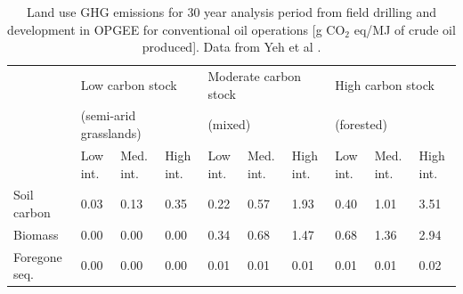 \documentclass[11pt]{report}
\begin{document}
\begin{table}
\begin{scriptsize}
\caption{Land use GHG emissions for 30 year analysis period from field drilling and development in OPGEE for conventional oil operations [g CO$_2$ eq/MJ of crude oil produced]. Data from Yeh et al \cite{Yeh2010}.}
\label{tab:default_land_use_emissions}
\begin{tabular}{p{}p{}p{}p{}p{}p{}p{}p{}p{}p{}}
\toprule
& \multicolumn{3}{p{0.25\columnwidth}}{Low carbon stock } & \multicolumn{3}{p{0.25\columnwidth}}{Moderate carbon stock } & \multicolumn{3}{p{0.25\columnwidth}}{High carbon stock}\\
& \multicolumn{3}{p{0.25\columnwidth}}{(semi-arid grasslands)} & \multicolumn{3}{p{0.25\columnwidth}}{(mixed)} & \multicolumn{3}{p{0.25\columnwidth}}{(forested)}\\
\cmidrule{2-4} \cmidrule{5-7} \cmidrule{8-10}
& Low int. & Med. int. & High int. & Low int. & Med. int. & High int. & Low int. & Med. int. & High int.\\
\midrule
Soil carbon & 0.03 & 0.13 & 0.35 & 0.22 & 0.57 & 1.93 & 0.40 & 1.01 & 3.51\\
Biomass & 0.00 & 0.00 & 0.00 & 0.34 & 0.68 & 1.47 & 0.68 & 1.36 & 2.94\\
Foregone seq.\ & 0.00 & 0.00 & 0.00 & 0.01 & 0.01 & 0.01 & 0.01 & 0.01 & 0.02\\
\bottomrule
\end{tabular}
\end{scriptsize}
\end{table}
\end{document}
